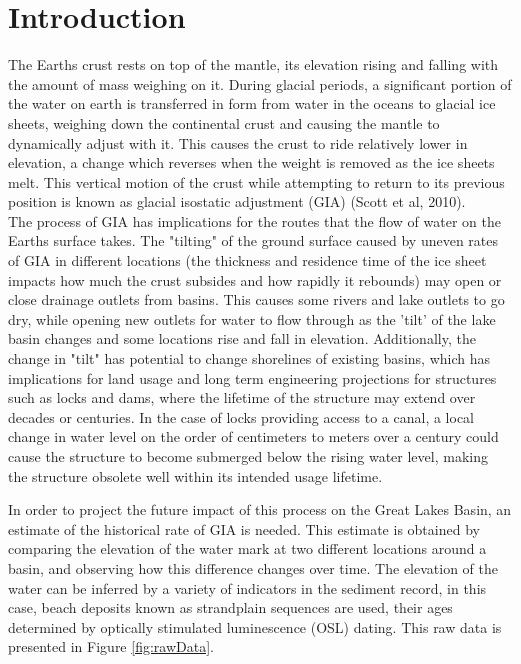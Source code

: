 \documentclass{article}
\begin{document}


\tableofcontents
\newpage


\newpage

\section{Introduction}

 The Earths crust rests on top of the mantle, its elevation rising and falling
 with the amount of mass weighing on it. During glacial periods, a significant portion
 of the water on earth is transferred in form from water in the oceans to glacial ice sheets,
 weighing down the continental crust and causing the mantle to dynamically adjust
 with it. This causes the crust to ride relatively lower in elevation,
 a change which reverses when the weight is removed as the ice sheets melt.
 This vertical motion of the crust while attempting to return to its previous position is known
 as glacial isostatic adjustment (GIA) (Scott et al, 2010).\\
 
 The process of GIA has implications for the routes that the flow
 of water on the Earths surface takes. The "tilting" of the ground surface caused by 
 uneven rates of GIA in different locations (the thickness and residence time of
 the ice sheet impacts how much the crust subsides and how rapidly it rebounds) 
 may open or close drainage outlets from basins. This
 causes some rivers and lake outlets to go dry, while opening new outlets for 
 water to flow through as the 'tilt' of the lake basin changes and some locations
 rise and fall in elevation.
 Additionally, the change in "tilt" has potential to change shorelines of existing
 basins,  which has implications for land usage and long term engineering
 projections for structures such as locks and dams, where the lifetime of
 the structure may extend over decades or centuries. In the case of locks providing
 access to a canal, a local change in water level on the order of centimeters to
 meters over a century could cause the structure to become submerged below the
 rising water level, making the structure obsolete well within its intended usage
 lifetime.\\

\newpage

 
 In order to project the future impact of this process on the Great Lakes Basin,
 an estimate of the historical rate of GIA is needed. This estimate is obtained by
 comparing the elevation of the water mark at two different locations around a basin, and
 observing how this difference changes over time. The elevation of the water can be inferred
 by a variety of indicators in the sediment record, in this case, beach deposits known
 as strandplain sequences are used, their ages determined by optically stimulated
 luminescence (OSL) dating. This raw data is presented in Figure \ref{fig:rawData}.\\

\end{document}

